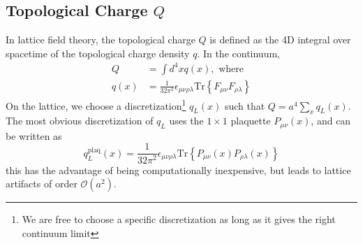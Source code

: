 \documentclass[a4paper,11pt]{article}
\begin{document}
\subsection{\label{subsec:topological_charge}Topological Charge \texorpdfstring{$Q$}{Q}}
%
In lattice field theory, the topological charge $Q$ is defined as the 4D
integral over spacetime of the topological charge density $q$.
%
In the continuum,
%
\begin{align}
    Q &= \int d^{4}x q(x), \text{ where } \\
    q(x) &= \frac{1}{32\pi^{2}} \epsilon_{\mu\nu\rho\lambda} \mathrm{Tr}\left\{ F_{\mu\nu} F_{\rho\lambda} \right\}
\end{align}
%
On the lattice, we choose a discretization\footnote{We are free to choose a specific discretization as long as it gives the right continuum limit} $q_{L}(x)$ such that
$Q = a^{4} \sum_{x} q_{L}(x)$.
%
The most obvious discretization of $q_{L}$ uses the $1\times1$ plaquette
$P_{\mu\nu}(x)$, and can be written as
%
\begin{equation}
    q^{\mathrm{plaq}}_{L}(x) = \frac{1}{32\pi^{2}} \epsilon_{\mu\nu\rho\lambda} \mathrm{Tr}\left\{P_{\mu\nu}(x) P_{\rho\lambda}(x)\right\}
\end{equation}
%
this has the advantage of being computationally inexpensive, but leads
to lattice artifacts of order $\mathcal{O}(a^{2})$.
\end{document}
